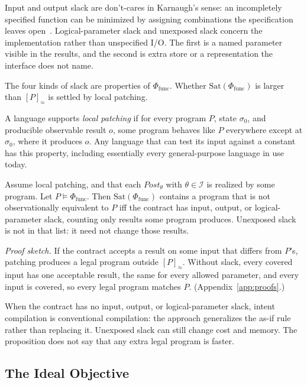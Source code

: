 Input and output slack are don't-cares in Karnaugh's sense: an incompletely
specified function can be minimized by assigning combinations the
specification leaves open~\cite{karnaugh1953map}.
Logical-parameter slack and unexposed slack concern the implementation
rather than unspecified I/O. The first is a named parameter visible in the
results, and the second is extra store or a representation the interface
does not name.

The four kinds of slack are properties of \(\Phi_{\text{func}}\). Whether
\(\mathrm{Sat}(\Phi_{\text{func}})\) is larger than \([P]_\approx\) is
settled by local patching.

A language supports \emph{local patching} if for every program \(P\), state
\(\sigma_0\), and producible observable result \(o\), some program behaves
like \(P\) everywhere except at \(\sigma_0\), where it produces \(o\). Any
language that can test its input against a constant has this property,
including essentially every general-purpose language in use today.

\begin{proposition}
\label{prop:expansion}
Assume local patching, and that each \(\mathit{Post}_\theta\) with
\(\theta \in \mathcal{I}\) is realized by some program. Let
\(P \models \Phi_{\text{func}}\). Then
\(\mathrm{Sat}(\Phi_{\text{func}})\) contains a program that is not
observationally equivalent to \(P\) iff the contract has input, output, or
logical-parameter slack, counting only results some program produces.
Unexposed slack is not in that list: it need not change those results.
\end{proposition}

\noindent\emph{Proof sketch.} If the contract accepts a result on some input
that differs from \(P\)'s, patching produces a legal program outside
\([P]_\approx\). Without slack, every covered input has one acceptable result,
the same for every allowed parameter, and every input is covered, so every
legal program matches \(P\). (Appendix~\ref{app:proofs}.)

When the contract has no input, output, or logical-parameter slack, intent
compilation is conventional compilation: the approach generalizes the as-if
rule rather than replacing it. Unexposed slack can still change cost and
memory. The proposition does not say that any extra legal program is faster.

\subsection{The Ideal Objective}
\label{sec:ideal_obj}

